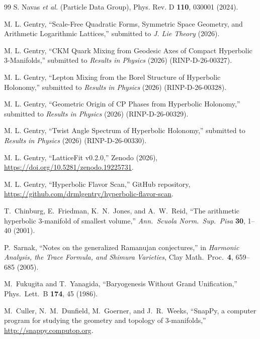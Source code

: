 \documentclass[12pt]{article}
\theoremstyle{definition}
\begin{document}
\begin{thebibliography}{99}
  S. Navas \textit{et al.} (Particle Data Group),
  Phys. Rev. D \textbf{110}, 030001 (2024).

  M. L. Gentry,
  ``Scale-Free Quadratic Forms, Symmetric Space Geometry, and Arithmetic Logarithmic Lattices,''
  submitted to \textit{J. Lie Theory} (2026).

  M. L. Gentry,
  ``CKM Quark Mixing from Geodesic Axes of Compact Hyperbolic 3-Manifolds,''
  submitted to \textit{Results in Physics} (2026) (RINP-D-26-00327).

  M. L. Gentry,
  ``Lepton Mixing from the Borel Structure of Hyperbolic Holonomy,''
  submitted to \textit{Results in Physics} (2026) (RINP-D-26-00328).

  M. L. Gentry,
  ``Geometric Origin of CP Phases from Hyperbolic Holonomy,''
  submitted to \textit{Results in Physics} (2026) (RINP-D-26-00329).

  M. L. Gentry,
  ``Twist Angle Spectrum of Hyperbolic Holonomy,''
  submitted to \textit{Results in Physics} (2026) (RINP-D-26-00330).

  M. L. Gentry,
  ``LatticeFit v0.2.0,''
  Zenodo (2026), \url{https://doi.org/10.5281/zenodo.19225731}.

  M. L. Gentry,
  ``Hyperbolic Flavor Scan,''
  GitHub repository, \url{https://github.com/drmlgentry/hyperbolic-flavor-scan}.

  T.~Chinburg, E.~Friedman, K.~N.~Jones, and A.~W.~Reid,
  ``The arithmetic hyperbolic 3-manifold of smallest volume,''
  \emph{Ann.\ Scuola Norm.\ Sup.\ Pisa} \textbf{30}, 1--40 (2001).

  P.~Sarnak,
  ``Notes on the generalized Ramanujan conjectures,''
  in \emph{Harmonic Analysis, the Trace Formula, and Shimura Varieties},
  Clay Math.\ Proc.\ \textbf{4}, 659--685 (2005).

  M.~Fukugita and T.~Yanagida,
  ``Baryogenesis Without Grand Unification,''
  Phys.\ Lett.\ B \textbf{174}, 45 (1986).

  M.~Culler, N.~M.~Dunfield, M.~Goerner, and J.~R.~Weeks,
  ``SnapPy, a computer program for studying the geometry and topology of 3-manifolds,''
  \url{http://snappy.computop.org}.
\end{thebibliography}
\end{document}
